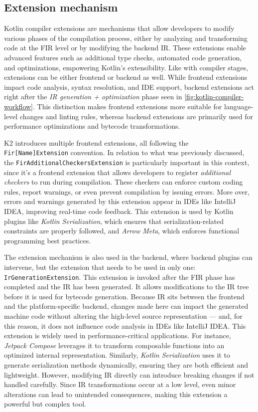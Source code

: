 \documentclass[12pt,a4paper,openright,twoside]{book}
\begin{document}
\subsection{Extension mechanism}

Kotlin compiler extensions are mechanisms that allow developers to modify
various phases of the compilation process, either by analyzing and transforming
code at the \ac{FIR} level or by modifying the backend \ac{IR}. These extensions
enable advanced features such as additional type checks, automated code
generation, and optimizations, empowering Kotlin’s extensibility.
%
Like with compiler stages, extensions can be either frontend or backend as well.
While frontend extensions impact code analysis, syntax resolution, and IDE
support, backend extensions act right after the \emph{IR generation +
optimization} phase seen in \cref{fig:kotlin-compiler-workflow}. This
distinction makes frontend extensions more suitable for language-level changes
and linting rules, whereas backend extensions are primarily used for performance
optimizations and bytecode transformations.

K2 introduces multiple frontend extensions, all following the
\lstinline{Fir[Name]Extension} convention. In relation to what was previously
discussed, the \lstinline{FirAdditionalCheckersExtension} is particularly
important in this context, since it's a frontend extension that allows
developers to register \emph{additional checkers} to run during compilation.
These checkers can enforce custom coding rules, report warnings, or even prevent
compilation by issuing errors. More over, errors and warnings generated by this
extension appear in IDEs like IntelliJ IDEA, improving real-time code feedback.
This extension is used by Kotlin plugins like \emph{Kotlin Serialization},
which ensures that serialization-related constraints are properly followed, and
\emph{Arrow Meta}, which enforces functional programming best practices.

The extension mechanism is also used in the backend, where backend plugins can
intervene, but the extension that needs to be used in only one:
\lstinline{IrGenerationExtension}. This extension is invoked after the \ac{FIR}
phase has completed and the \ac{IR} has been generated. It allows modifications
to the IR tree before it is used for bytecode generation. Because IR sits
between the frontend and the platform-specific backend, changes made here can
impact the generated machine code without altering the high-level source
representation --- and, for this reason, it does not influence code analysis
in \acp{IDE} like IntelliJ IDEA. This extension is widely used in performance-critical
applications. For instance, \emph{Jetpack Compose} leverages it to transform
composable functions into an optimized internal representation. Similarly,
\emph{Kotlin Serialization} uses it to generate serialization methods dynamically,
ensuring they are both efficient and lightweight. However, modifying IR directly
can introduce breaking changes if not handled carefully. Since IR
transformations occur at a low level, even minor alterations can lead to
unintended consequences, making this extension a powerful but complex tool.
\end{document}

